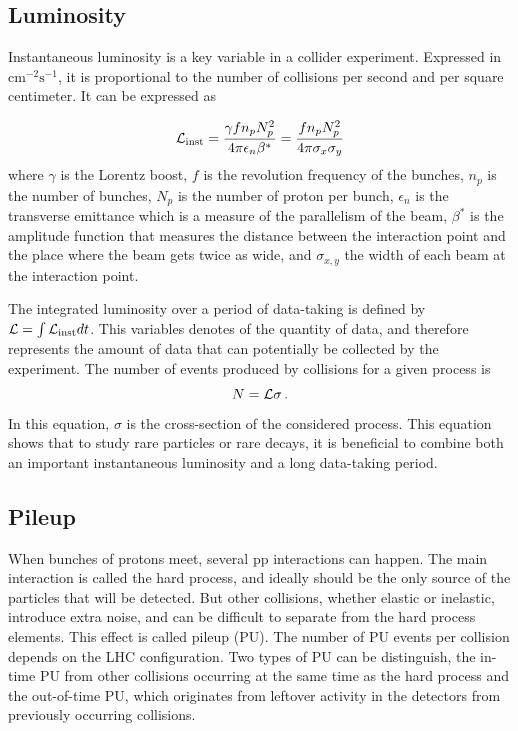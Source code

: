 \subsection{Luminosity}

Instantaneous luminosity is a key variable in a collider experiment. Expressed in $\mathrm{cm^{-2} s^{-1}}$, it is proportional to the number of collisions per second and per square centimeter. It can be expressed as

\begin{equation}
    \mathcal{L}_{\rm{inst}} = \frac{\gamma f n_p N_p^2}{4\pi \epsilon_n \beta^{*}} = \frac{f n_p N_p^2}{4\pi \sigma_x \sigma_y}
\end{equation}
where $\gamma$ is the Lorentz boost, $f$ is the revolution frequency of the bunches, $n_p$ is the number of bunches, $N_p$ is the number of proton per bunch, $\epsilon_n$ is the transverse emittance which is a measure of the parallelism of the beam, $\beta^*$ is the amplitude function that measures the distance between the interaction point and the place where the beam gets twice as wide, and $\sigma_{x,y}$ the width of each beam at the interaction point.

The integrated luminosity over a period of data-taking is defined by $\mathcal{L} = \int \mathcal{L}_{\rm{inst}} dt$. This variables denotes of the quantity of data, and therefore represents the amount of data that can potentially be collected by the experiment. The number of events produced by collisions for a given process is 
\begin{equation}
    N = \Lagr \sigma \mend
\end{equation}
In this equation, $\sigma$ is the cross-section of the considered process. This equation shows that to study rare particles or rare decays, it is beneficial to combine both an important instantaneous luminosity and a long data-taking period.

\subsection{Pileup}

When bunches of protons meet, several pp interactions can happen. The main interaction is called the hard process, and ideally should be the only source of the particles that will be detected. But other collisions, whether elastic or inelastic, introduce extra noise, and can be difficult to separate from the hard process elements. This effect is called pileup (PU). The number of PU events per collision depends on the LHC configuration. Two types of PU can be distinguish, the in-time PU from other collisions occurring at the same time as the hard process and the out-of-time PU, which originates from leftover activity in the detectors from previously occurring collisions.

